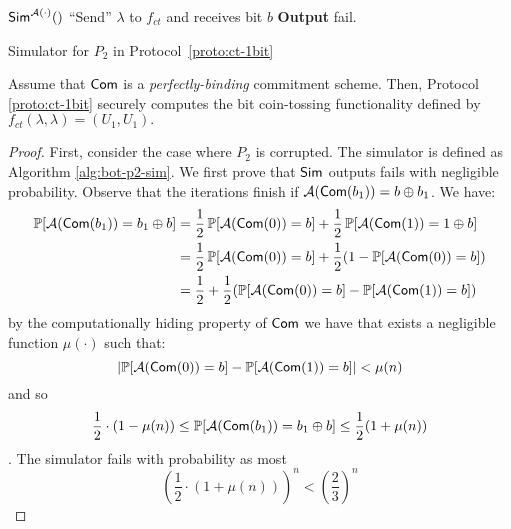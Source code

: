 \begin{algorithm}
${\sf Sim}^{\mathcal{A}(\cdot)}()$\;
``Send'' $\lambda$ to $f_{ct}$ and receives bit $b$\;
{\bf Output} {\sf fail}.

\caption{Simulator for $P_2$ in Protocol~\ref{proto:ct-1bit}}\label{alg:ct-1bit-sim}
\end{algorithm}

\begin{theorem} Assume that ${\sf Com}$ is a {\it perfectly-binding} commitment scheme. Then, Protocol \ref{proto:ct-1bit} securely computes the bit coin-tossing functionality defined by $f_{ct}(\lambda, \lambda)=(U_1,U_1).$
\end{theorem}
\begin{proof}
First, consider the case where $P_2$ is corrupted. The simulator is defined as Algorithm \ref{alg:bot-p2-sim}. We first prove that ${\sf Sim}$ outputs {\sf fails} with negligible probability.
Observe that the iterations finish if $\mathcal{A}({\sf Com}(b_1))=b\oplus b_1$. We have:
    \begin{align*}
        \mathop{\mathbb P\/}[\mathcal{A}({\sf Com}(b_1))=b_1\oplus b]&=\frac{1}{2}\mathop{\mathbb P\/}[\mathcal{A}({\sf Com}(0))=b]+\frac{1}{2}\mathop{\mathbb P\/}[\mathcal{A}({\sf Com}(1))=1\oplus b]\\
        &=\frac{1}{2}\mathop{\mathbb P\/}[\mathcal{A}({\sf Com}(0))=b]+\frac{1}{2}(1-\mathop{\mathbb P\/}[\mathcal{A}({\sf Com}(0))=b]) \\
        &=\frac{1}{2}+\frac{1}{2}(\mathop{\mathbb P\/}[\mathcal{A}({\sf Com}(0))=b]-\mathop{\mathbb P\/}[\mathcal{A}({\sf Com}(1))=b])
    \end{align*}
by the computationally hiding property of ${\sf Com}$ we have that exists a negligible function $\mu(\cdot)$ such that:
$$
    \left|\mathop{\mathbb P\/}[\mathcal{A}({\sf Com}(0))=b]-\mathop{\mathbb P\/}[\mathcal{A}({\sf Com}(1))=b]\right|<\mu(n)
$$
and so
$$
    \frac{1}{2}\cdot(1-\mu(n))\leq\mathop{\mathbb P\/}[\mathcal{A}({\sf Com}(b_1))=b_1\oplus b]\leq\frac{1}{2}(1+\mu(n))
$$.
The simulator fails with probability as most
$$
    \left(\frac{1}{2}\cdot(1+\mu(n))\right)^n <\left(\frac{2}{3}\right)^n
$$
\end{proof}